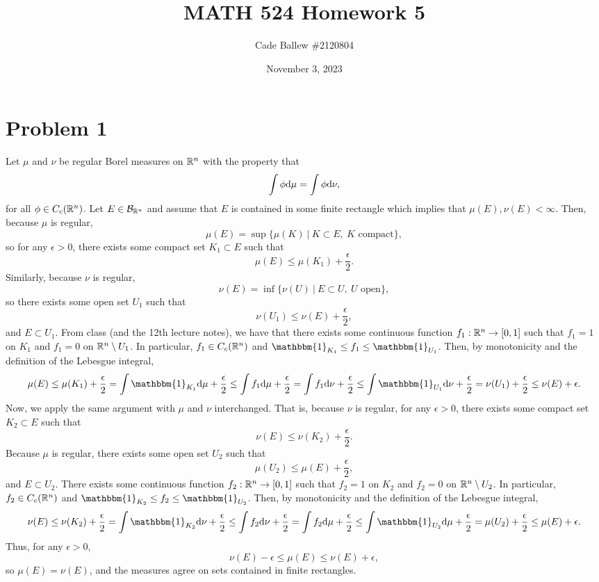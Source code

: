 \documentclass{article}
\title{MATH 524 Homework 5}
\author{Cade Ballew \#2120804}
\date{November 3, 2023}
\begin{document}
	
\maketitle
	
\section{Problem 1}
Let $\mu$ and $\nu$ be regular Borel measures on $\mathbb{R}^n$ with the property that
\[
\int\phi\mathrm{d}\mu=\int\phi\mathrm{d}\nu,
\]
for all $\phi\in C_c(\mathbb{R}^n)$. Let $E\in\mathcal B_{\mathbb{R}^n}$ and assume that $E$ is contained in some finite rectangle which implies that $\mu(E),\nu(E)<\infty$. Then, because $\mu$ is regular,
\[
\mu(E)=\sup\{\mu(K)~|~K\subset E,~K\text{ compact}\},
\]
so for any $\epsilon>0$, there exists some compact set $K_1\subset E$ such that
\[
\mu(E)\leq \mu(K_1)+\frac{\epsilon}{2}.
\]
Similarly, because $\nu$ is regular,
\[
\nu(E)=\inf\{\nu(U)~|~E\subset U,~U\text{ open}\},
\]
so there exists some open set $U_1$ such that
\[
\nu(U_1)\leq\nu(E)+\frac{\epsilon}{2},
\]
and $E\subset U_1$. From class (and the 12th lecture notes), we have that there exists some continuous function $f_1:\mathbb{R}^n\to[0,1]$ such that $f_1=1$ on $K_1$ and $f_1=0$ on $\mathbb{R}^n\setminus U_1$. In particular, $f_1\in C_c(\mathbb{R}^n)$ and $\mathbbm{1}_{K_1}\leq f_1\leq\mathbbm{1}_{U_1}$. Then, by monotonicity and the definition of the Lebesgue integral,
\begin{align*}
\mu(E)\leq \mu(K_1)+\frac{\epsilon}{2}=\int \mathbbm{1}_{K_1}\df\mu+\frac{\epsilon}{2}\leq\int f_1\df\mu+\frac{\epsilon}{2}=\int f_1\df\nu+\frac{\epsilon}{2}\leq \int \mathbbm{1}_{U_1}\df\nu+\frac{\epsilon}{2}=\nu(U_1)+\frac{\epsilon}{2}\leq\nu(E)+\epsilon.
\end{align*}
Now, we apply the same argument with $\mu$ and $\nu$ interchanged. That is, because $\nu$ is regular,
for any $\epsilon>0$, there exists some compact set $K_2\subset E$ such that
\[
\nu(E)\leq \nu(K_2)+\frac{\epsilon}{2}.
\]
Because $\mu$ is regular, there exists some open set $U_2$ such that
\[
\mu(U_2)\leq\mu(E)+\frac{\epsilon}{2},
\]
and $E\subset U_2$. There exists some continuous function $f_2:\mathbb{R}^n\to[0,1]$ such that $f_2=1$ on $K_2$ and $f_2=0$ on $\mathbb{R}^n\setminus U_2$. In particular, $f_2\in C_c(\mathbb{R}^n)$ and $\mathbbm{1}_{K_2}\leq f_2\leq\mathbbm{1}_{U_2}$. Then, by monotonicity and the definition of the Lebesgue integral,
\begin{align*}
	\nu(E)\leq \nu(K_2)+\frac{\epsilon}{2}=\int \mathbbm{1}_{K_2}\df\nu+\frac{\epsilon}{2}\leq\int f_2\df\nu+\frac{\epsilon}{2}=\int f_2\df\mu+\frac{\epsilon}{2}\leq \int \mathbbm{1}_{U_2}\df\mu+\frac{\epsilon}{2}=\mu(U_2)+\frac{\epsilon}{2}\leq\mu(E)+\epsilon.
\end{align*}
Thus, for any $\epsilon>0$,
\[
\nu(E)-\epsilon\leq\mu(E)\leq\nu(E)+\epsilon,
\]
so $\mu(E)=\nu(E)$, and the measures agree on sets contained in finite rectangles. 
\end{document}

